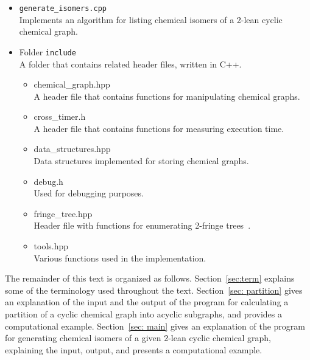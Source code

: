 \documentclass[11pt,titlepage,dvipdfmx,twoside]{book}
\begin{document}
\begin{itemize}
\begin{itemize}
\begin{itemize}
		    \item{ \tt generate\_isomers.cpp}\\
			    Implements an algorithm for listing chemical isomers of
			    a 2-lean cyclic chemical graph.

	\item Folder {\tt include}\\
		A folder that contains related header files, written in C++.
		\begin{itemize}
			\item{chemical\_graph.hpp}\\
			  A header file that contains functions for manipulating 
			  chemical graphs.
			\item{cross\_timer.h}\\
				A header file that contains functions for measuring execution time.
				
			\item{data\_structures.hpp}\\
				Data structures implemented for storing chemical graphs.
				
			\item{debug.h}\\
				Used for debugging purposes.
				
			\item{fringe\_tree.hpp}\\
				Header file with functions for enumerating 2-fringe trees~\cite{AN20}.
				
			\item{tools.hpp}\\
				Various functions used in the implementation.
		\end{itemize}
		\end{itemize}
	  \end{itemize}
      \end{itemize}

The remainder of this text is organized as follows.
Section~\ref{sec:term} explains some of the terminology used throughout the text.
Section~\ref{sec: partition} gives an explanation of the input and the output of
the program for calculating a partition of a cyclic chemical graph into
acyclic subgraphs, and provides a computational example.
Section~\ref{sec: main}
gives an explanation of the program for generating chemical isomers of
a given 2-lean cyclic chemical graph, explaining the input, output, and
presents a computational example.


\end{document}
